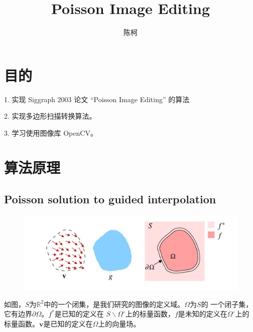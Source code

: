 \documentclass{article}
\title{Poisson Image Editing}
\author{陈柯}
\begin{document}
	\maketitle
	
	\section{目的}
	1. 实现 Siggraph 2003 论文 “Poisson Image Editing” 的算法
	
	2. 实现多边形扫描转换算法。
	
	3. 学习使用图像库 OpenCV。
	
	\section{算法原理}
	
	\subsection{Poisson solution to guided interpolation}
	\begin{figure}[htb]
		\begin{center}
			\includegraphics[width=6in]{Guided interpolation notations.jpg}
		\end{center}
	\end{figure}
	如图，$S$为$\mathbb{R}^2$中的一个闭集，是我们研究的图像的定义域。$\Omega$为$S$的
	一个闭子集，它有边界$\partial\Omega$。$f^*$是已知的定义在
	$S\backslash\Omega^{\circ}$上的标量函数，$f$是未知的定义在$\Omega^{\circ}$上的
	标量函数。$\mathbf{v}$是已知的定义在$\Omega$上的向量场。
	
\end{document}
